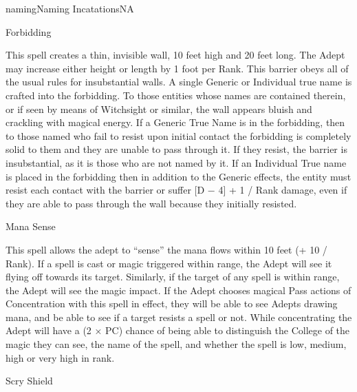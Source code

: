 \begin{College}[2.0]{naming}{Naming Incatations}{NA}
\begin{spell}[S-6]{Forbidding}
\begin{effects}
This spell creates a thin, invisible wall, 10 feet high and 20 feet
long. The Adept may increase either height or length by 1 foot per
Rank.  This barrier obeys all of the usual rules for insubstantial
walls.  A single Generic or Individual true name is crafted into the
forbidding. To those entities whose names are contained therein, or if
seen by means of Witchsight or similar, the wall appears bluish and
crackling with magical energy.  If a Generic True Name is in the
forbidding, then to those named who fail to resist upon initial
contact the forbidding is completely solid to them and they are unable
to pass through it.  If they resist, the barrier is insubstantial, as
it is those who are not named by it. If an Individual True name is
placed in the forbidding then in addition to the Generic effects, the
entity must resist each contact with the barrier or suffer [D − 4] + 1
/ Rank damage, even if they are able to pass through the wall because
they initially resisted.
\end{effects}
\end{spell}

\begin{spell}[S-7]{Mana Sense}

\begin{effects}
This spell allows the adept to “sense” the mana flows within 10 feet
(+ 10 / Rank). If a spell is cast or magic triggered within range, the
Adept will see it flying off towards its target. Similarly, if the
target of any spell is within range, the Adept will see the magic
impact.  If the Adept chooses magical Pass actions of Concentration
with this spell in effect, they will be able to see Adepts drawing
mana, and be able to see if a target resists a spell or not.  While
concentrating the Adept will have a (2 × PC) chance of being able to
distinguish the College of the magic they can see, the name of the
spell, and whether the spell is low, medium, high or very high in
rank.
\end{effects}
\end{spell}

\begin{spell}[S-8]{Scry Shield}


\end{spell}
\end{College}
